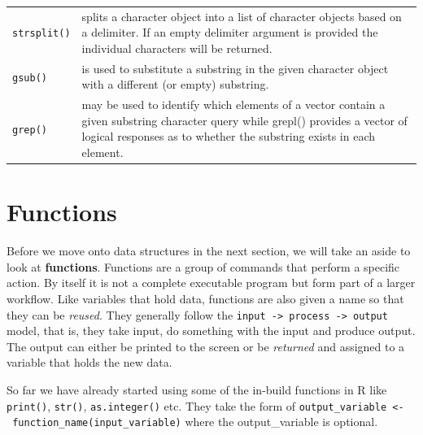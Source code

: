 \documentclass[a4paper]{book}
\begin{document}
\begin{longtable}[]{@{}ll@{}}
\begin{minipage}[t]{0.21\columnwidth}
\texttt{strsplit()}\strut
\end{minipage} & \begin{minipage}[t]{0.73\columnwidth}\raggedright\strut
splits a character object into a list of character objects based on a
delimiter. If an empty delimiter argument is provided the individual
characters will be returned.\strut
\end{minipage}\tabularnewline
\begin{minipage}[t]{0.21\columnwidth}\raggedright\strut
\texttt{gsub()}\strut
\end{minipage} & \begin{minipage}[t]{0.73\columnwidth}\raggedright\strut
is used to substitute a substring in the given character object with a
different (or empty) substring.\strut
\end{minipage}\tabularnewline
\begin{minipage}[t]{0.21\columnwidth}\raggedright\strut
\texttt{grep()}\strut
\end{minipage} & \begin{minipage}[t]{0.73\columnwidth}\raggedright\strut
may be used to identify which elements of a vector contain a given
substring character query while grepl() provides a vector of logical
responses as to whether the substring exists in each element.\strut
\end{minipage}\tabularnewline
\bottomrule
\end{longtable}

\section{Functions}\label{functions}

Before we move onto data structures in the next section, we will take an
aside to look at \textbf{functions}. Functions are a group of commands
that perform a specific action. By itself it is not a complete
executable program but form part of a larger workflow. Like variables
that hold data, functions are also given a name so that they can be
\emph{reused}. They generally follow the
\texttt{input\ -\textgreater{}\ process\ -\textgreater{}\ output} model,
that is, they take input, do something with the input and produce
output. The output can either be printed to the screen or be
\emph{returned} and assigned to a variable that holds the new data.

So far we have already started using some of the in-build functions in R
like \texttt{print()}, \texttt{str()}, \texttt{as.integer()} etc. They
take the form of
\texttt{output\_variable\ \textless{}-\ function\_name(input\_variable)}
where the output\_variable is optional.
\end{document}
